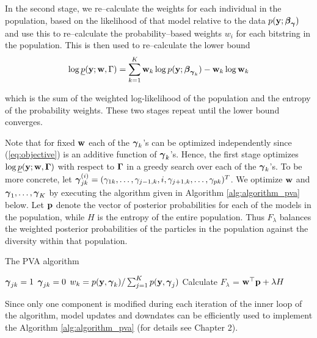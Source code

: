 In the second stage, we re--calculate the weights for each individual in the
population, based on the likelihood of that model relative to the data $p({\bf y};
{\boldsymbol \beta}_{\boldsymbol \gamma})$ and use this to re--calculate the probability--based weights
$w_i$ for each bitstring in the population. This is then used to re--calculate
the lower bound
\[
	\log \underline{p}({\bf y}; {\bf w}, \Gamma) = \sum_{k=1}^K {\bf w}_k \log p({\bf y}; {\boldsymbol \beta}_{{\boldsymbol \gamma}_k}) - {\bf w}_k \log {\bf w}_k
\]

\noindent 
which is the sum of the weighted log-likelihood of the population and the
entropy of the probability weights.  These two stages repeat until the lower
bound converges.

Note that for fixed ${\bf w}$ each of the ${\boldsymbol \gamma}_k$'s can be optimized
independently since (\ref{eq:objective}) is an additive function of
${\boldsymbol \gamma}_k$'s. Hence, the first stage optimizes $\log
\underline{p}({\bf y};{\bf w},{\boldsymbol \Gamma})$ with respect to ${\boldsymbol \Gamma}$ in a greedy search
over each of the  ${\boldsymbol \gamma}_k$'s.  To be more concrete, let ${\boldsymbol \gamma}_{jk}^{(i)}
= (\gamma_{1k},\ldots,\gamma_{j-1,k},i,\gamma_{j+1,k},\ldots,\gamma_{pk})^T$.
We optimize ${\bf w}$ and ${\boldsymbol \gamma}_1,\ldots,{\boldsymbol \gamma}_K$ by executing the algorithm
given in Algorithm \ref{alg:algorithm_pva} below. Let ${\bf p}$ denote the vector
of posterior probabilities for each of the models  in the population, while $H$
is the entropy of the entire population. Thus $F_\lambda$ balances the weighted
posterior  probabilities of the particles in the population against the
diversity within that population.

\begin{algorithm}\label{alg:updateGamma}
	\caption{The PVA algorithm}
	\label{alg:algorithm_pva}
	\begin{algorithmic}
		\medskip 
		\medskip
				\medskip
					\medskip
						\medskip
						\STATE ${\boldsymbol \gamma}_{jk} = 1$
					\ELSE
					\medskip
						\STATE ${\boldsymbol \gamma}_{jk} = 0$
					\ENDIF
				\ENDFOR
				\medskip
				\STATE $w_k = p({\bf y}, {\boldsymbol \gamma}_k) / \sum_{j=1}^K p({\bf y}, {\boldsymbol \gamma}_j)$
			\ENDFOR
			\medskip
			\STATE Calculate $F_\lambda$ = ${\bf w}^\top {\bf p} + \lambda H$
		\ENDWHILE
	\end{algorithmic}
\end{algorithm}

    \noindent 
    Since only one component is modified during each iteration of the inner
    loop of the algorithm, model updates and downdates can be efficiently used
    to implement the Algorithm \ref{alg:algorithm_pva} (for details see
    Chapter 2).

